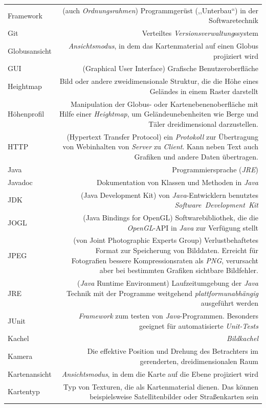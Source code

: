 \documentclass[10pt]{scrreprt}
\newcommand{\textref}[1]{\mbox{\raisebox{0.1ex}{\small$\rightarrow$ }\textit{#1}}}
\begin{document}
\begin{longtabu}{L{0.35} R{1.65}}
Framework & (auch \textit{Ordnungsrahmen}) Programmgerüst (,,Unterbau``) in der Softwaretechnik \\
Git & Verteiltes \textref{Versionsverwaltung}ssystem\\
Globusansicht & \textref{Ansichtsmodus}, in dem das Kartenmaterial auf einen Globus projiziert wird\\
GUI& (Graphical User Interface) Grafische Benutzeroberfläche\\
Heightmap & Bild oder andere zweidimensionale Struktur, die die Höhe eines Geländes in einem Raster darstellt\\
Höhenprofil & Manipulation der Globus- oder Kartenebenenoberfläche mit Hilfe einer \textref{Heightmap}, um Geländeunebenheiten wie Berge und Täler dreidimensional darzustellen.\\
HTTP & (Hypertext Transfer Protocol) ein \textref{Protokoll} zur Übertragung von Webinhalten von \textref{Server} zu \textref{Client}. Kann neben Text auch Grafiken und andere Daten übertragen.\\
Java & Programmiersprache (\textref{JRE})\\
Javadoc & Dokumentation von Klassen und Methoden in \textref{Java}\\
JDK & (Java Development Kit) von \textref{Java}-Entwicklern benutztes \textref{Software Development Kit}\\
JOGL & (Java Bindings for OpenGL) Softwarebibliothek, die die \textref{OpenGL}-API in \textref{Java} zur Verfügung stellt\\
JPEG & (von Joint Photographic Experts Group) Verlustbehaftetes Format zur Speicherung von Bilddaten. Erreicht für Fotografien bessere Kompressionsraten als \textref{PNG}, verursacht aber bei bestimmten Grafiken sichtbare Bildfehler.\\
JRE & (\textref{Java} Runtime Environment) Laufzeitumgebung der \textref{Java} Technik mit der Programme weitgehend \textref{plattformunabhängig} ausgeführt werden\\
JUnit & \textref{Framework} zum testen von \textref{Java}-Programmen. Besonders geeignet für automatisierte \textref{Unit-Tests}\\
Kachel & \textref{Bildkachel}\\
Kamera & Die effektive Position und Drehung des Betrachters im gerenderten, dreidimensionalen Raum\\
Kartenansicht & \textref{Ansichtsmodus}, in dem die Karte auf die Ebene projiziert wird\\
Kartentyp & Typ von Texturen, die als Kartenmaterial dienen. Das können beispielsweise Satellitenbilder oder Straßenkarten sein\\

\end{longtabu}
\end{document}
